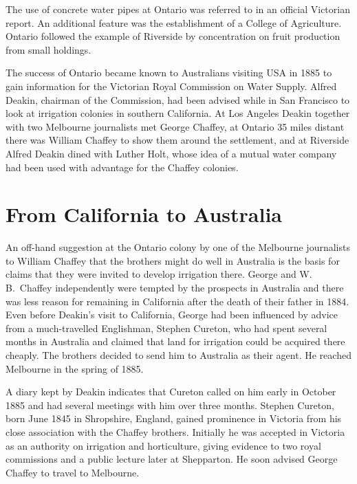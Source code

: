 The use of concrete water pipes at Ontario was referred to in an
official Victorian report.  An additional feature was the
establishment of a College of Agriculture.  Ontario followed the
example of Riverside by concentration on fruit production from small
holdings.

The success of Ontario became known to Australians visiting USA in
1885 to gain information for the Victorian Royal Commission on Water
Supply.  Alfred Deakin,
chairman of the Commission, had been advised while in San Francisco to
look at irrigation colonies in southern California.  At Los Angeles
Deakin together with two Melbourne journalists met George Chaffey, at
Ontario 35 miles distant there was William Chaffey to show them around
the settlement, and at Riverside Alfred Deakin dined with Luther Holt,
whose idea of a mutual water company had been used with advantage for
the Chaffey colonies.

\section*{From California to Australia}

An off-hand suggestion at the Ontario colony by one of the Melbourne
journalists to William Chaffey that the brothers might do well in
Australia is the basis for claims that they were invited to develop
irrigation there.  George and
W.\,B.~Chaffey independently were tempted by the prospects in
Australia and there was less reason for remaining in California after
the death of their father in 1884.  Even before Deakin's visit to
California, George had been influenced by advice from a much-travelled
Englishman, Stephen Cureton, who had spent several months in Australia
and claimed that land for irrigation could be acquired there cheaply.
The brothers decided to send him to Australia as their agent.  He
reached Melbourne in the spring of 1885.

A diary kept by Deakin indicates that Cureton called on him early in
October 1885 and had several meetings with him over three
months.  Stephen Cureton,
born June 1845 in Shropshire, England, gained prominence in Victoria
from his close association with the Chaffey brothers.  Initially he
was accepted in Victoria as an authority on irrigation and
horticulture, giving evidence to two royal commissions and a public
lecture later at Shepparton.  He soon advised George Chaffey to travel
to Melbourne.


